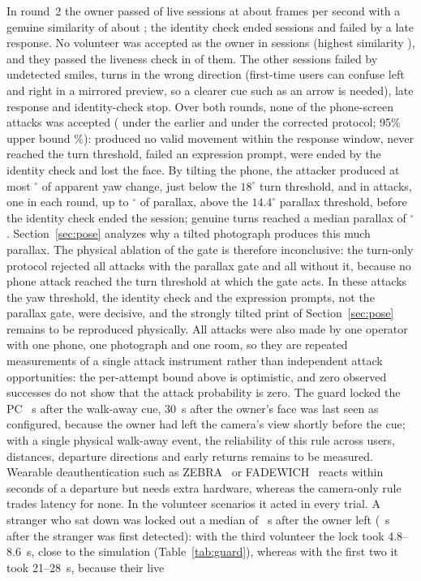 \documentclass[journal]{IEEEtran}
\begin{document}
In round~2 the owner passed \rwOwnerPass{} of \rwOwnerN{} live sessions at about \rwFps{} frames per second with a genuine similarity of about \rwOwnerSim; the identity check ended \rwOwnerFailIdent{} sessions and \rwOwnerFailLate{} failed by a late response. No volunteer was accepted as the owner in \rwVolN{} sessions (highest similarity \rwVolSim), and they passed the liveness check in \rwVolLive{} of them. The other sessions failed by \rwVolFailSmile{} undetected smiles, \rwVolFailWrong{} turns in the wrong direction (first-time users can confuse left and right in a mirrored preview, so a clearer cue such as an arrow is needed), \rwVolFailLate{} late response and \rwVolFailIdent{} identity-check stop. Over both rounds, none of the \rwAllAttN{} phone-screen attacks was accepted (\rwRoundOneAttN{} under the earlier and \rwAttN{} under the corrected protocol; 95\% upper bound \rwAllAttUpper\%): \rwAttNoResp{} produced no valid movement within the response window, \rwAttTurnTO{} never reached the turn threshold, \rwAttExprTO{} failed an expression prompt, \rwAttIdent{} were ended by the identity check and \rwAttLost{} lost the face. By tilting the phone, the attacker produced at most \rwAllAttYawMax$^\circ$ of apparent yaw change, just below the $18^\circ$ turn threshold, and in \rwAttOverPar{} attacks, one in each round, up to \rwAllAttParMax$^\circ$ of parallax, above the $14.4^\circ$ parallax threshold, before the identity check ended the session; genuine turns reached a median parallax of \rwOwnerParMed$^\circ$. Section~\ref{sec:pose} analyzes why a tilted photograph produces this much parallax. The physical ablation of the gate is therefore inconclusive: the turn-only protocol rejected all \rwAttTurnsGate{} attacks with the parallax gate and all \rwAttTurnsNoGate{} without it, because no phone attack reached the turn threshold at which the gate acts. In these attacks the yaw threshold, the identity check and the expression prompts, not the parallax gate, were decisive, and the strongly tilted print of Section~\ref{sec:pose} remains to be reproduced physically. All attacks were also made by one operator with one phone, one photograph and one room, so they are repeated measurements of a single attack instrument rather than independent attack opportunities: the per-attempt bound above is optimistic, and zero observed successes do not show that the attack probability is zero. The guard locked the PC \rwWalkBeep~s after the walk-away cue, 30~s after the owner's face was last seen as configured, because the owner had left the camera's view shortly before the cue; with a single physical walk-away event, the reliability of this rule across users, distances, departure directions and early returns remains to be measured. Wearable deauthentication such as ZEBRA~\cite{mare2014zebra} or FADEWICH~\cite{conti2017fadewich} reacts within seconds of a departure but needs extra hardware, whereas the camera-only rule trades latency for none. In the volunteer scenarios it acted in every trial. A stranger who sat down was locked out a median of \rwIntrBeep~s after the owner left (\rwIntrLat~s after the stranger was first detected): with the third volunteer the lock took 4.8--8.6~s, close to the simulation (Table~\ref{tab:guard}), whereas with the first two it took 21--28~s, because their live 
\end{document}
